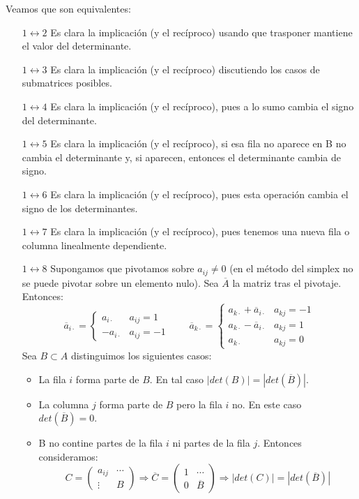 \documentclass[PM.tex]{subfiles}
\begin{document}
\begin{dem}
Veamos que son equivalentes:
\begin{itemize}
\item [$1 \leftrightarrow 2$] Es clara la implicación (y el recíproco) usando que trasponer mantiene el valor del determinante.
\item [$1 \leftrightarrow 3$] Es clara la implicación (y el recíproco) discutiendo los casos de submatrices posibles.
\item [$1 \leftrightarrow 4$] Es clara la implicación (y el recíproco), pues a lo sumo cambia el signo del determinante.
\item [$1 \leftrightarrow 5$] Es clara la implicación (y el recíproco), si esa fila no aparece en B no cambia el determinante y, si aparecen, entonces el determinante cambia de signo.
\item [$1 \leftrightarrow 6$] Es clara la implicación (y el recíproco), pues esta operación cambia el signo de los determinantes.
\item [$1 \leftrightarrow 7$] Es clara la implicación (y el recíproco), pues tenemos una nueva fila o columna linealmente dependiente.
\item [$1 \leftrightarrow 8$] Supongamos que pivotamos sobre $a_{ij}\neq 0$ (en el método del simplex no se puede pivotar sobre un elemento nulo). Sea $\overline{A}$ la matriz tras el pivotaje. Entonces:
\[
\overline{a}_{i\cdot}=
\begin{cases}
a_{i\cdot} & a_{ij}=1\\
-a_{i\cdot} & a_{ij}=-1
\end{cases}
\qquad
\overline{a}_{k\cdot}=
\begin{cases}
{a}_{k\cdot}+\overline{a}_{i\cdot} & a_{kj}=-1\\
{a}_{k\cdot}-\overline{a}_{i\cdot} & a_{kj}=1\\
{a}_{k\cdot} & a_{kj}=0
\end{cases}
\]
Sea $B\subset A$ distinguimos los siguientes casos:
\begin{itemize}
\item La fila $i$ forma parte de $B$. En tal caso $|det(B)|=|det(\overline{B})|$.
\item La columna $j$ forma parte de $B$ pero la fila $i$ no. En este caso $det(\overline{B})=0$.
\item B no contine partes de la fila $i$ ni partes de la fila $j$. Entonces consideramos:
\[
C=
\begin{pmatrix}
a_{ij} & \cdots\\
\vdots & B
\end{pmatrix} \Rightarrow \overline{C} = 
\begin{pmatrix}
1 & \cdots\\
0 & \overline{B}
\end{pmatrix} \Rightarrow |det(C)| = |det(\overline{B})|
\]
\end{itemize}
\end{itemize}
\end{dem}
\end{document}
